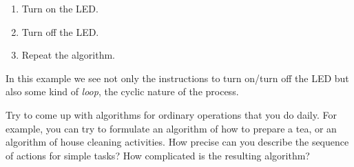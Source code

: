 \documentclass[../sparc.tex]{subfiles}
\begin{document}
\begin{enumerate}
\item Turn on the LED.
\item Turn off the LED.
\item Repeat the algorithm.
\end{enumerate}

In this example we see not only the instructions to turn on/turn off the LED but
also some kind of \emph{loop}, the cyclic nature of the process.

 { Try to come up with algorithms for ordinary operations that you
  do daily.  For example, you can try to formulate an algorithm of how to
  prepare a tea, or an algorithm of house cleaning activities.  How precise can
  you describe the sequence of actions for simple tasks?  How complicated is the
  resulting algorithm? }
\end{document}
